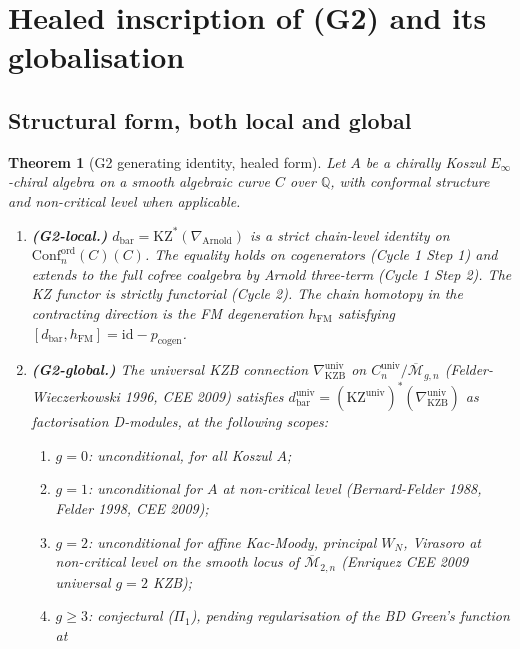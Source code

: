 \documentclass[12pt]{article}
\providecommand{\KZ}{\mathrm{KZ}}
\providecommand{\KZB}{\mathrm{KZB}}
\providecommand{\Arn}{\mathrm{Arnold}}
\providecommand{\Conf}{C}
\providecommand{\Confnord}[1][C]{\mathrm{Conf}_n^{\mathrm{ord}}(#1)}
\providecommand{\Mbar}{\overline{\mathcal{M}}}
\providecommand{\dbar}{d_{\mathrm{bar}}}
\newtheorem{theorem}{Theorem}[section]
\theoremstyle{definition}
\begin{document}
\section{Healed inscription of (G2) and its globalisation}
\label{sec:G2-healed}

\subsection{Structural form, both local and global}
\label{ssec:G2-structural}

\begin{theorem}[G2 generating identity, healed form]
\label{thm:G2-healed}
Let $A$ be a chirally Koszul $E_\infty$-chiral algebra on a
smooth algebraic curve $C$ over $\mathbb{Q}$, with conformal
structure and non-critical level when applicable.
\begin{enumerate}
\item \textbf{(G2-local.)} $\dbar = \KZ^{*}(\nabla_{\Arn})$ is
  a strict chain-level identity on $\Confnord(C)$.  The
  equality holds on cogenerators (Cycle 1 Step 1) and extends
  to the full cofree coalgebra by Arnold three-term (Cycle 1
  Step 2).  The KZ functor is strictly functorial
  (Cycle 2).  The chain homotopy in the contracting
  direction is the FM degeneration $h_{\mathrm{FM}}$
  satisfying $[\dbar, h_{\mathrm{FM}}] = \mathrm{id} - p_{\mathrm{cogen}}$.
\item \textbf{(G2-global.)} The universal KZB connection
  $\nabla_{\KZB}^{\mathrm{univ}}$ on
  $\Conf_n^{\mathrm{univ}}/\Mbar_{g,n}$ (Felder-Wieczerkowski
  1996, CEE 2009) satisfies
  $\dbar^{\mathrm{univ}} = (\KZ^{\mathrm{univ}})^{*}(\nabla_{\KZB}^{\mathrm{univ}})$
  as factorisation D-modules, at the following scopes:
  \begin{enumerate}[label=\textup{(2-\roman*)}]
   \item $g = 0$: unconditional, for all Koszul $A$;
   \item $g = 1$: unconditional for $A$ at non-critical level
    (Bernard-Felder 1988, Felder 1998, CEE 2009);
   \item $g = 2$: unconditional for affine Kac-Moody,
    principal $W_N$, Virasoro at non-critical level on the
    smooth locus of $\Mbar_{2,n}$ (Enriquez CEE 2009
    universal $g = 2$ KZB);
   \item $g \geq 3$: conjectural ($\Pi_1$), pending
    regularisation of the BD Green's function at

\end{enumerate}
\end{enumerate}
\end{theorem}
\end{document}
